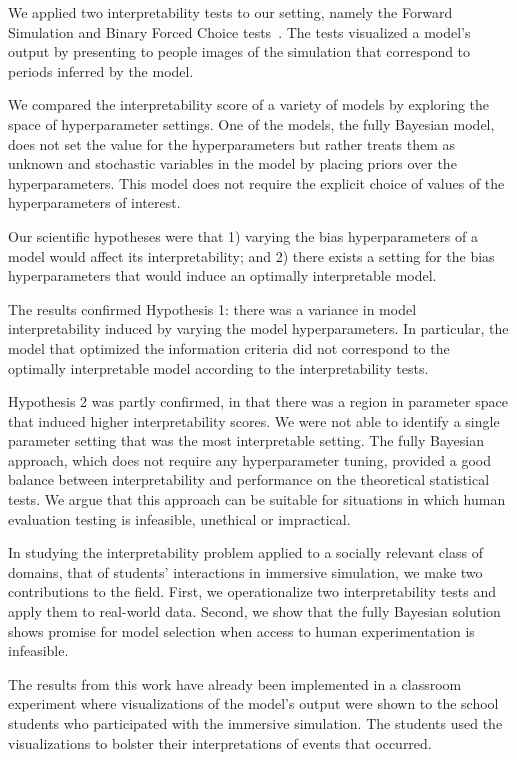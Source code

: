 \documentclass[letterpaper]{article} %
\begin{document}
We applied two interpretability tests to our setting, namely the Forward Simulation and Binary Forced Choice tests~\cite{doshi2017roadmap}.
The tests visualized a model's output by presenting to people images of the simulation that correspond to periods inferred by the model.

We compared the interpretability score %
of a variety of models by exploring the space of hyperparameter settings.
One of the models, the fully Bayesian model, does not set the value for the hyperparameters but rather treats them as unknown and stochastic variables in the model by placing priors over the hyperparameters.
This model does not require the explicit choice of values of the hyperparameters of interest.

Our scientific hypotheses were that 1) varying the bias hyperparameters of a model would affect its interpretability; and 2) there exists a setting for the bias hyperparameters that would induce an optimally interpretable model.


The results confirmed Hypothesis 1: there was a variance in model interpretability induced by varying the model hyperparameters.
In particular, the model that optimized the information criteria did not correspond to the optimally interpretable model according to the interpretability tests.

Hypothesis 2 was partly confirmed, in that there was a region in parameter space that induced higher interpretability scores. We were not able to identify a single parameter setting that was the most interpretable setting.
The fully Bayesian approach, which does not require any hyperparameter tuning, provided a good balance between interpretability and performance on the theoretical statistical tests.
We argue that this approach can be suitable for situations in which human evaluation testing is infeasible, unethical or impractical.




In studying the interpretability problem applied to a socially relevant class of domains, that of students' interactions in immersive simulation, we make two contributions to the field.
First, we operationalize two interpretability tests and apply them to real-world data.
Second, we show that the fully Bayesian solution shows promise for model selection when access to human experimentation is infeasible.

The results from this work have already been implemented in a classroom experiment where visualizations of the model's output were shown to the school students who participated with the immersive simulation. The students used the visualizations to bolster their interpretations of events that occurred.
\end{document}
